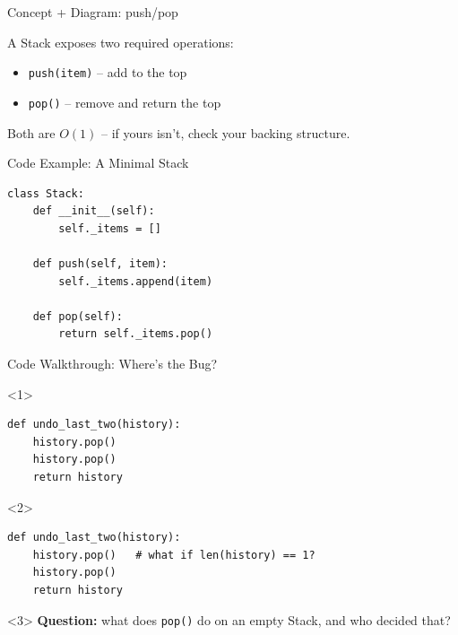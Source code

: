 \documentclass[aspectratio=169]{beamer}
\begin{document}
\begin{frame}{Concept + Diagram: push/pop}
\conceptdiagramkicker
\begin{conceptdiagrambody}
  \begin{concepttext}
    A Stack exposes two required operations:
    \begin{itemize}
      \item \texttt{push(item)} -- add to the top
      \item \texttt{pop()} -- remove and return the top
    \end{itemize}
    \vspace{2mm}
    Both are $O(1)$ -- if yours isn't, check your backing structure.
  \end{concepttext}
  \begin{conceptdiagram}
  \end{conceptdiagram}
\end{conceptdiagrambody}
\end{frame}

\begin{frame}[fragile]{Code Example: A Minimal Stack}
\codeframekicker
\begin{lstlisting}
class Stack:
    def __init__(self):
        self._items = []

    def push(self, item):
        self._items.append(item)

    def pop(self):
        return self._items.pop()
\end{lstlisting}
\end{frame}

\begin{frame}[fragile,t]{Code Walkthrough: Where's the Bug?}
\codewalkthroughkicker
\begin{onlyenv}<1>
\begin{lstlisting}
def undo_last_two(history):
    history.pop()
    history.pop()
    return history
\end{lstlisting}
\end{onlyenv}
\begin{onlyenv}<2>
\begin{lstlisting}
def undo_last_two(history):
    history.pop()   # what if len(history) == 1?
    history.pop()
    return history
\end{lstlisting}
\end{onlyenv}
\begin{onlyenv}<3>
  \vspace{2mm}
  \textbf{Question:} what does \texttt{pop()} do on an empty Stack, and
  who decided that?
\end{onlyenv}
\end{frame}
\end{document}
